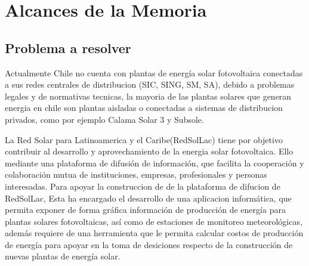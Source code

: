 \chapter{Alcances de la Memoria}
\label{alcances}

\section{Problema a resolver}

Actualmente Chile no cuenta con plantas de energía solar fotovoltaica conectadas a sus redes centrales de distribucion (SIC, SING, SM, SA), debido a problemas legales y de normativas tecnicas, la mayoria de las plantas solares que generan energia en chile son plantas aisladas o conectadas a sistemas de distribucion privados, como por ejemplo Calama Solar 3\cite{plantaSolar:1} y Subsole\cite{subsole:2}.

La Red Solar para Latinoamerica y el Caribe(RedSolLac) tiene por objetivo contribuir al desarrollo y aprovechamiento de la energia solar fotovoltaica. Ello mediante una plataforma de difusión de información, que facilita la cooperación y colaboración mutua de instituciones, empresas, profesionales y personas interesadas.
Para apoyar la construccion de de la plataforma de difucion de RedSolLac, Esta ha encargado el desarrollo de una aplicacion informática, que permita exponer de forma gráfica información de producción de energía para plantas solares fotovoltaicas, así como de estaciones de monitoreo meteorológicas, además requiere de una herramienta que le permita calcular costos de producción de energía para apoyar en la toma de desiciones respecto de la construcción de nuevas plantas de energía solar.

